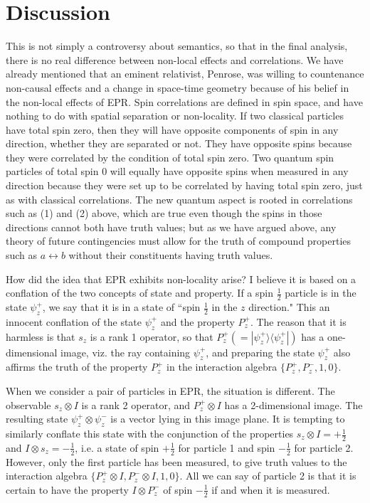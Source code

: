 \documentclass[12pt]{article}
\begin{document}
\section{Discussion}
This is not simply a controversy about semantics, so that in the final analysis, there is no real difference between non-local effects and correlations. We have already mentioned that an eminent relativist, Penrose, was willing to countenance non-causal effects and a change in space-time geometry because of his belief in the non-local effects of EPR. Spin correlations are defined in spin space, and have nothing to do with spatial separation or non-locality. If two classical particles have total spin zero, then they will have opposite components of spin in any direction, whether they are separated or not. They have opposite spins because they were correlated by the condition of total spin zero. Two quantum spin particles of total spin 0 will equally have opposite spins when measured in any direction because they were set up to be correlated by having total spin zero, just as with classical correlations. The new quantum aspect is rooted in correlations such as (1) and (2) above, which are true even though the spins in those directions cannot both have truth values; but as we have argued above, any theory of future contingencies must allow for the truth of compound properties such as  $a\leftrightarrow b$ without their constituents having truth values.

How did the idea that EPR exhibits non-locality arise? I believe it is based on a conflation of the two concepts of state and property. If a spin $\frac{1}{2}$ particle is in the state $\psi_z^+$, we say that it is in a state of ``spin $\frac{1}{2}$ in the $z$ direction." This an innocent conflation of the state $\psi_z^+$ and the property $P_z^+.$   The reason that it is harmless  is that $s_z$ is a rank 1 operator, so that $P_z^+(= |\psi_z^+ \rangle \langle \psi_z^+|)$ has a one-dimensional image, viz. the ray containing $\psi_z^+$, and preparing the state $\psi_z^+$ also affirms the truth of the property $P_z^+$ in the interaction algebra $\{ P_z^+, P_z^-, 1, 0\}$.

When we consider a pair of particles in EPR, the situation is different. The observable $s_z\otimes I$ is a rank 2 operator, and $P_z^+\otimes I$  has a 2-dimensional image. The resulting state $\psi_z^+\otimes\psi_z^-$ is a vector lying in this image plane. It is tempting to similarly conflate this state with the conjunction of the properties $s_z\otimes I  =  +\frac{1}{2}$ and $I\otimes s_z = -\frac{1}{2}$, i.e. a state of spin $+\frac{1}{2}$  for particle 1 and spin $-\frac{1}{2}$ for particle 2. However, only the first particle has been measured, to give truth values to the interaction algebra $\{ P_z^+\otimes I, P_z^-\otimes I, 1, 0\}.$ All we can say of particle 2 is that it is certain to have the property $I\otimes  P_z^-$ of spin $-\frac{1}{2}$ if and when it is measured.  
\end{document}
